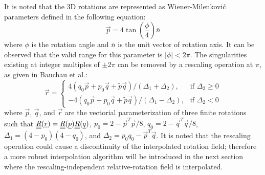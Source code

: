 It is noted that the 3D rotations are represented as Wiener-Milenkovi\'c parameters \cite{Bauchau-etal:2008,Wang:GEBT2013} defined in the following equation:
 \begin{equation}
     \vec{p} = 4 \tan\left(\frac{\phi}{4} \right) \bar{n} 
     \label{WMParameter}
 \end{equation}
where $\phi$ is the rotation angle and $\bar{n}$ is the unit vector of
rotation axis. It can be observed that the valid range for this parameter is
$|\phi| < 2 \pi$. The singularities existing at integer multiples of $\pm 2 \pi$ can be removed by a rescaling operation at $\pi$, as given
in Bauchau et al.\cite{Bauchau-etal:2008}:
\begin{equation}
    \label{RescaledWM}
    \vec{r} = \begin{cases}
    4(q_0\vec{p} + p_0 \vec{q} + \tilde{p} \vec{q} ) / (\Delta_1 + \Delta_2), & \text{if } \Delta_2 \geq 0 \\
    -4(q_0\vec{p} + p_0 \vec{q} + \tilde{p} \vec{q} ) / (\Delta_1 - \Delta_2), & \text{if } \Delta_2 < 0
    \end{cases}
\end{equation}
where $\vec{p}$, $\vec{q}$, and $\vec{r}$ are the vectorial parameterization of three finite rotations such that $\underline{\underline{R}}(\underline{r}) = \underline{\underline{R}}(\underline{p}) \underline{\underline{R}}(\underline{q})$, $p_0 = 2 - \vec{p}^T \vec{p}/8$, $q_0 = 2 - \vec{q}^T \vec{q}/8$, $\Delta_1 = (4-p_0)(4-q_0)$, and $\Delta_2 = p_0 q_0 - \vec{p}^T \vec{q}$.
It is noted that the rescaling operation could cause a discontinuity of the
interpolated rotation field; therefore a more robust interpolation algorithm
will be introduced in the next section where the rescaling-independent
relative-rotation field is interpolated. 
